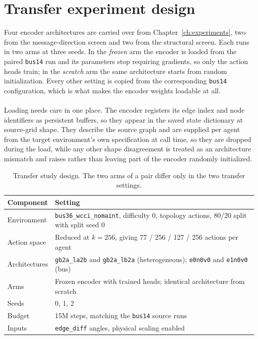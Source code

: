 \section{Transfer experiment design}
\label{sec:wcci-design}

Four encoder architectures are carried over from Chapter~\ref{ch:experiments},
two from the message-direction screen and two from the structural screen. Each
runs in two arms at three seeds. In the \emph{frozen} arm the encoder is loaded
from the paired \texttt{bus14} run and its parameters stop requiring gradients,
so only the action heads train; in the \emph{scratch} arm the same architecture
starts from random initialization. Every other setting is copied from the
corresponding \texttt{bus14} configuration, which is what makes the encoder
weights loadable at all.
\\
\\
Loading needs care in one place. The encoder registers its edge index and node
identifiers as persistent buffers, so they appear in the saved state dictionary
at source-grid shape. They describe the source graph and are supplied per agent
from the target environment's own specification at call time, so they are
dropped during the load, while any other shape disagreement is treated as an
architecture mismatch and raises rather than leaving part of the encoder
randomly initialized.

\begin{table}[H]
  \centering
  \small
  \caption{Transfer study design. The two arms of a pair differ only in the two
  transfer settings.}
  \label{tab:wcci-transfer-design}
  \setlength{\tabcolsep}{5pt}
  \begin{tabular}{L{0.26\textwidth}L{0.66\textwidth}}
    \toprule
    Component & Setting \\
    \midrule
    Environment & \texttt{bus36\_wcci\_nomaint}, difficulty 0, topology actions, 80/20 split with split seed 0 \\
    Action space & Reduced at $k=256$, giving 77 / 256 / 127 / 256 actions per agent \\
    Architectures & \texttt{gb2a\_la2b} and \texttt{gb2a\_lb2a} (heterogeneous); \texttt{e0n0v0} and \texttt{e1n0v0} (bus) \\
    Arms & Frozen encoder with trained heads; identical architecture from scratch \\
    Seeds & 0, 1, 2 \\
    Budget & 15M steps, matching the \texttt{bus14} source runs \\
    Inputs & \texttt{edge\_diff} angles, physical scaling enabled \\
    \bottomrule
  \end{tabular}
\end{table}

